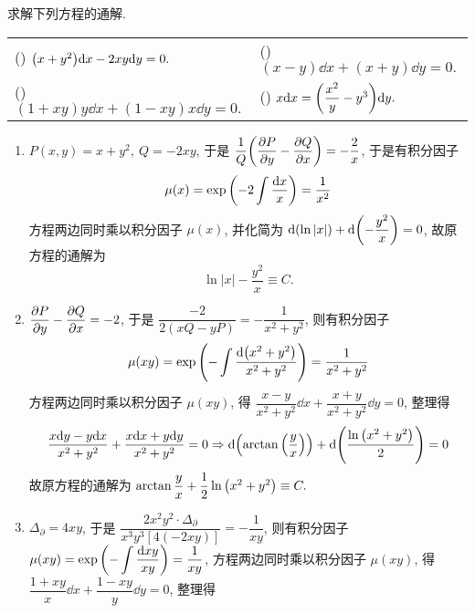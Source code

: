 \begin{example}
    求解下列方程的通解.
    \setcounter{magicrownumbers}{0}
    \begin{table}[H]
        \centering
        \begin{tabular}{l | l}
            (\rownumber{}) $\qty(x+y^2)\dd x-2xy\dd y=0.$ & (\rownumber{}) $(x-y)\dd x+(x+y)\dd y=0.$              \\
            (\rownumber{}) $(1+xy)y\dd x+(1-xy)x\dd y=0.$ & (\rownumber{}) $x\dd x=\qty(\dfrac{x^2}{y}-y^3)\dd y.$ \\
        \end{tabular}
    \end{table}
\end{example}
\begin{solution}
    \begin{enumerate}[label=(\arabic{*})]
        \item $P(x,y)=x+y^2,~Q=-2xy$, 于是 $\dfrac{1}{Q}\qty(\displaystyle\pdv{P}{y}-\pdv{Q}{x})=-\dfrac{2}{x}$,
              于是有积分因子 $$\mu(x)=\exp\qty(-2\displaystyle\int\dfrac{\dd x}{x})=\dfrac{1}{x^2}$$
              方程两边同时乘以积分因子 $\mu(x)$, 并化简为 $\dd \qty(\ln|x|)+\dd \qty(-\dfrac{y^2}{x})=0$, 故原方程的通解为 $$\ln|x|-\dfrac{y^2}{x}\equiv C.$$
        \item $\displaystyle\pdv{P}{y}-\pdv{Q}{x}=-2$, 于是 $\dfrac{-2}{2(xQ-yP)}=-\dfrac{1}{x^2+y^2}$, 则有积分因子 $$\mu(xy)=\exp\qty(-\displaystyle\int\dfrac{\dd \qty(x^2+y^2)}{x^2+y^2})=\dfrac{1}{x^2+y^2}$$
              方程两边同时乘以积分因子 $\mu(xy)$, 得 $\dfrac{x-y}{x^2+y^2}\dd x+\dfrac{x+y}{x^2+y^2}\dd y=0$,
              整理得 $$\dfrac{x\dd y-y\dd x}{x^2+y^2}+\dfrac{x\dd x+y\dd y}{x^2+y^2}=0\Rightarrow \dd \qty(\arctan\qty(\dfrac{y}{x}))+\dd \qty(\dfrac{\ln\qty(x^2+y^2)}{2})=0$$
              故原方程的通解为 $\arctan\dfrac{y}{x}+\dfrac{1}{2}\ln\qty(x^2+y^2)\equiv C.$
        \item $\Delta_\partial=4xy$, 于是 $\dfrac{2x^2y^2\cdot\Delta_\partial}{x^3y^3[4(-2xy)]}=-\dfrac{1}{xy}$, 则有积分因子 $\mu(xy)=\exp\qty(-\displaystyle\int\dfrac{\dd xy}{xy})=\dfrac{1}{xy}$,
              方程两边同时乘以积分因子 $\mu(xy)$, 得 $\dfrac{1+xy}{x}\dd x+\dfrac{1-xy}{y}\dd y=0$, 整理得
\end{enumerate}
\end{solution}
